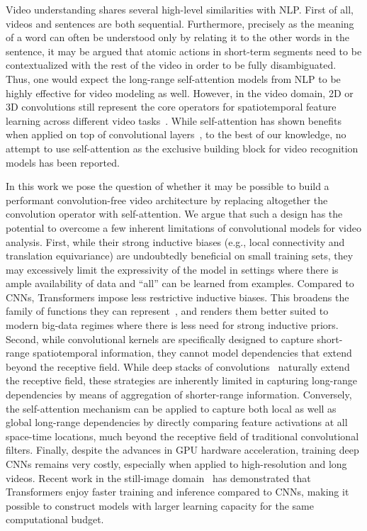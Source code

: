 \documentclass{article}
\begin{document}
Video understanding shares several high-level similarities with NLP. First of all, videos and sentences are both sequential. Furthermore, precisely as the meaning of a word can often be understood only by relating it to the other words in the sentence, it may be argued that atomic actions in short-term segments need to be contextualized with the rest of the video in order to be fully disambiguated. Thus, one would expect the long-range self-attention models from NLP to be highly effective for video modeling as well. However, in the video domain, 2D or 3D convolutions still represent the core operators for spatiotemporal feature learning across different video tasks~\cite{Feichtenhofer_2019_ICCV,  DBLP:conf/eccv/TeedD20, gberta_2020_CVPR}. While self-attention has shown benefits when applied on top of convolutional layers~\cite{Wang_2018_CVPR}, to the best of our knowledge, no attempt to use self-attention as the exclusive building block for video recognition models has been reported. 

In this work we pose the question of whether it may be possible to build a performant convolution-free video architecture by replacing altogether the convolution operator with self-attention. We argue that such a design has the potential to overcome a few inherent limitations of convolutional models for video analysis. First, while their strong inductive biases (e.g., local connectivity and translation equivariance) are undoubtedly beneficial on small training sets, they may excessively limit the expressivity of the model in settings where there is ample availability of data and ``all'' can be learned from examples. %
Compared to CNNs, Transformers impose less restrictive inductive biases. This broadens the family of functions they can represent~\cite{Cordonnier:ICLR2020, Zhao:CVPR2020}, and renders them better suited to modern big-data regimes where there is less need for strong inductive priors. Second, while convolutional kernels are specifically designed to capture short-range spatiotemporal information, they cannot model dependencies that extend beyond the receptive field. While deep stacks of convolutions~\cite{Simonyan14c, 43022, DBLP:conf/cvpr/CarreiraZ17} naturally extend the receptive field, these strategies are inherently limited in capturing long-range dependencies by means of aggregation of shorter-range information. Conversely, the self-attention mechanism can be applied to capture both local as well as global long-range dependencies by directly comparing feature activations at all space-time locations, much beyond the receptive field of traditional convolutional filters. Finally, despite the advances in GPU hardware acceleration, training deep CNNs remains very costly, especially when applied to high-resolution and long videos. Recent work in the still-image domain~\cite{Dosovitskiy:ICLR2021, DETR, Zhao:CVPR2020} has demonstrated that Transformers enjoy faster training and inference compared to CNNs,  making it possible to construct models with larger learning capacity for the same computational budget. %
\end{document}
